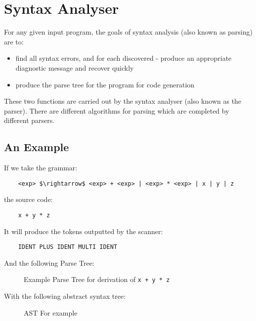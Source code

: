 \section{Syntax Analyser}
For any given input program, the goals of syntax analysis (also known as parsing) are to:
\begin{itemize}
    \item find all syntax errors, and for each discovered - produce an appropriate diagnostic message and recover quickly
    \item produce the parse tree for the program for code generation
\end{itemize}
These two functions are carried out by the syntax analyser (also known as the parser). There are different algorithms for parsing which are completed by different parsers.

\subsection{An Example}
If we take the grammar:
\begin{lstlisting}
    <exp> $\rightarrow$ <exp> + <exp> | <exp> * <exp> | x | y | z
\end{lstlisting}
the source code:
\begin{verbatim}
    x + y * z
\end{verbatim}
It will produce the tokens outputted by the scanner:
\begin{verbatim}
    IDENT PLUS IDENT MULTI IDENT
\end{verbatim}
And the following Parse Tree:
\begin{figure}[H]
\centering
{}
\caption{Example Parse Tree for derivation of \texttt{x + y * z}}
\end{figure}
With the following abstract syntax tree:
\begin{figure}[H]
\centering
{}
\caption{AST For example}
\end{figure}

